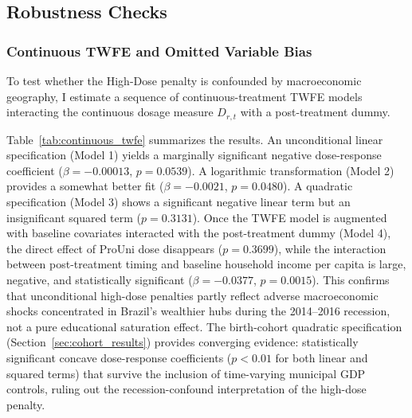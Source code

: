 \subsection{Robustness Checks}
\label{sec:robustness_results}

\subsubsection{Continuous TWFE and Omitted Variable Bias}

To test whether the High-Dose penalty is confounded by macroeconomic geography, I estimate a sequence of continuous-treatment TWFE models interacting the continuous dosage measure $D_{r,t}$ with a post-treatment dummy.

Table~\ref{tab:continuous_twfe} summarizes the results. An unconditional linear specification (Model 1) yields a marginally significant negative dose-response coefficient ($\beta = -0.00013$, $p = 0.0539$). A logarithmic transformation (Model 2) provides a somewhat better fit ($\beta = -0.0021$, $p = 0.0480$). A quadratic specification (Model 3) shows a significant negative linear term but an insignificant squared term ($p = 0.3131$). Once the TWFE model is augmented with baseline covariates interacted with the post-treatment dummy (Model 4), the direct effect of ProUni dose disappears ($p = 0.3699$), while the interaction between post-treatment timing and baseline household income per capita is large, negative, and statistically significant ($\beta = -0.0377$, $p = 0.0015$). This confirms that unconditional high-dose penalties partly reflect adverse macroeconomic shocks concentrated in Brazil's wealthier hubs during the 2014--2016 recession, not a pure educational saturation effect. The birth-cohort quadratic specification (Section~\ref{sec:cohort_results}) provides converging evidence: statistically significant concave dose-response coefficients ($p < 0.01$ for both linear and squared terms) that survive the inclusion of time-varying municipal GDP controls, ruling out the recession-confound interpretation of the high-dose penalty.

